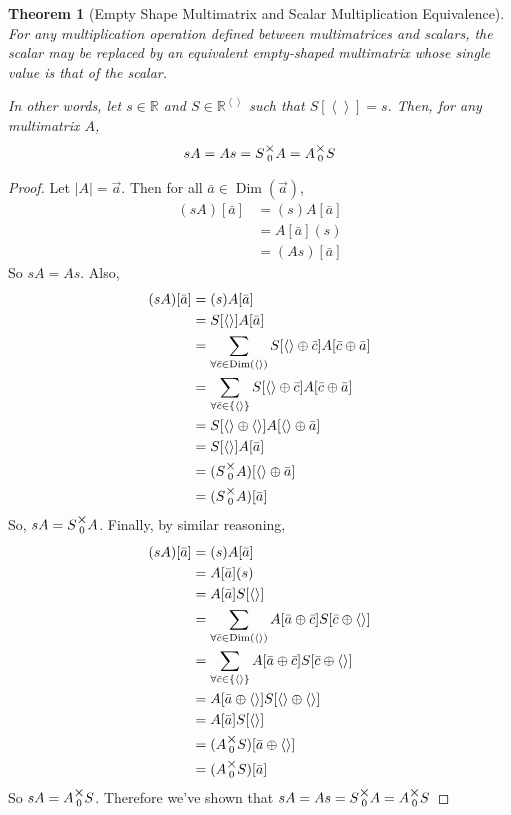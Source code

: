 \documentclass[12pt]{book}
\theoremstyle{plain}
\newtheorem{theorem}{Theorem}[chapter]
\theoremstyle{definition}
\theoremstyle{ppart}
\theoremstyle{case}
\theoremstyle{solution}
\DeclareMathOperator{\Dim}{Dim}
\newcommand{\mmult}[1]{\text{\raisebox{1ex}{$\underset{#1}{\times}$}}}
\newcommand{\shape}[1]{\left|#1\right|}
\begin{document}
\begin{theorem}[Empty Shape Multimatrix and Scalar Multiplication Equivalence]
\label{s_mm_mult_equiv}
For any multiplication operation defined between multimatrices and scalars,
the scalar may be replaced by an equivalent empty-shaped multimatrix whose
single value is that of the scalar.

In other words, let $s \in \mathbb{R}$ and $S \in \mathbb{R}^{\left<\right>}$ such that
$S[\left<\right>] = s$. Then, for any multimatrix $A$, 
\[ sA = As = S \mmult{0} A = A \mmult{0} S \]
\end{theorem}
\begin{proof}
Let $\shape{A} = \vec{a}$. Then for all $\bar{a} \in \Dim(\vec{a})$,
\begin{align*}
	(sA)[\bar{a}]
	&= (s)A[\bar{a}] \\
	&= A[\bar{a}](s) \\
	&= (As)[\bar{a}]
\end{align*}
So $sA = As$. Also,
\begin{align*}
	(sA)[\bar{a}]
	&= (s)A[\bar{a}] \\
	&= S[\left<\right>]A[\bar{a}] \\
	&= \sum_{\forall \bar{c} \in \Dim(\left<\right>)}
		S[\left<\right> \oplus \bar{c}]A[\bar{c} \oplus \bar{a}] \\
	&= \sum_{\forall \bar{c} \in \{\left<\right>\}}
		S[\left<\right> \oplus \bar{c}]A[\bar{c} \oplus \bar{a}] \\
	&= S[\left<\right> \oplus \left<\right>]A[\left<\right> \oplus \bar{a}] \\
	&= S[\left<\right>]A[\bar{a}] \\
	&= (S \mmult{0} A)[\left<\right> \oplus \bar{a}] \\
	&= (S \mmult{0} A)[\bar{a}] \\
\end{align*}
So, $sA = S \mmult{0} A$.
Finally, by similar reasoning,
\begin{align*}
	(sA)[\bar{a}]
	&= (s)A[\bar{a}] \\
	&= A[\bar{a}](s) \\
	&= A[\bar{a}]S[\left<\right>] \\
	&= \sum_{\forall \bar{c} \in \Dim(\left<\right>)}
		A[\bar{a} \oplus \bar{c}] S[\bar{c} \oplus \left<\right>] \\
	&= \sum_{\forall \bar{c} \in \{\left<\right>\}}
		A[\bar{a} \oplus \bar{c}] S[\bar{c} \oplus \left<\right>] \\
	&= A[\bar{a} \oplus \left<\right>] S[\left<\right> \oplus \left<\right>] \\
	&= A[\bar{a}]S[\left<\right>] \\
	&= (A \mmult{0} S)[\bar{a} \oplus \left<\right>] \\
	&= (A \mmult{0} S)[\bar{a}]
\end{align*}
So $sA = A \mmult{0} S$. Therefore we've shown that
$sA = As = S \mmult{0} A = A \mmult{0} S$
\end{proof}
\end{document}
